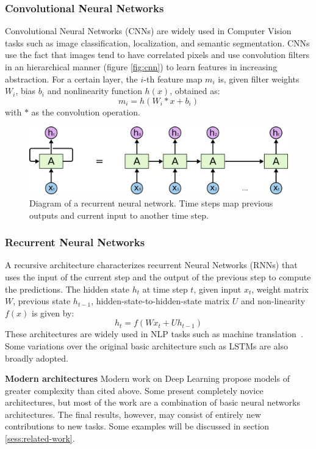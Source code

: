 \documentclass[12pt]{article}
\begin{document}
\subsubsection{Convolutional Neural Networks}
Convolutional Neural Networks (CNNs) are widely used in Computer Vision tasks such as image classification, localization, and semantic segmentation.
CNNs use the fact that images tend to have correlated pixels and use
convolution filters in an hierarchical manner (figure \ref{fig:cnn})
to learn features in increasing abstraction.
For a certain layer, the $i$-th feature map $m_i$ is,
given filter weights $W_i$, bias $b_i$ and nonlinearity function $h(x)$,
obtained as:
$$m_i = h\left(W_i * x + b_i\right)$$
with $*$ as the convolution operation.

\begin{figure}
\begin{center}
    \includegraphics[width=0.9\linewidth]{./img/rnn2.png}
\caption{
    Diagram of a recurrent neural network.
    Time steps map previous outputs and current input to another time step.
}
\label{fig:rnn}
\end{center}
\end{figure}

\subsubsection{Recurrent Neural Networks}
A recursive architecture characterizes recurrent Neural Networks (RNNs)
that uses the input of the current step and the output of the previous
step to compute the predictions.
The hidden state $h_t$ at time step $t$, given input $x_t$, weight matrix $W$,
previous state $h_{t-1}$, hidden-state-to-hidden-state matrix $U$ and
non-linearity $f(x)$ is given by:
$$h_t = f\left(Wx_t + Uh_{t-1}\right)$$
These architectures are widely used in NLP tasks such as
machine translation~\cite{ref:rnn-nlp}.
Some variations over the original basic architecture such as
LSTMs are also broadly adopted.

\textbf{Modern architectures}
Modern work on Deep Learning propose models of greater complexity than cited above.
Some present completely novice architectures, but most of the work are a combination of basic neural networks architectures. The final results, however, may consist
of entirely new contributions to new tasks.
Some examples will be discussed in section \ref{sess:related-work}.
\end{document}
